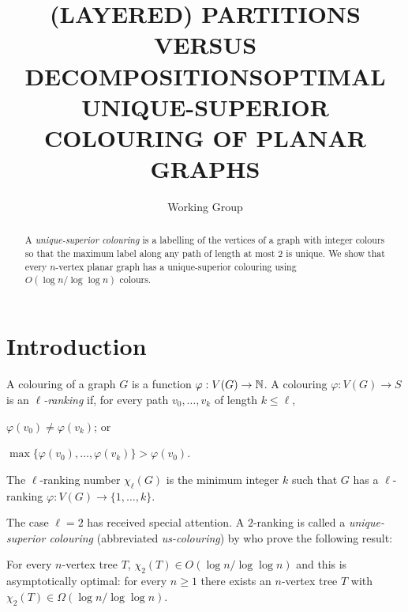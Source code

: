 \documentclass[kpfonts]{patmorin}
\title{\MakeUppercase{(Layered) Partitions versus Decompositions}}
\author{}
\title{\MakeUppercase{Optimal Unique-Superior Colouring of Planar Graphs}}
\author{Working Group}
\newcommand{\uqs}{\chi_2}
\begin{document}
\maketitle

\begin{abstract}
  A \emph{unique-superior colouring} is a labelling of the vertices of a graph with integer colours so that the maximum label along any path of length at most 2 is unique.  We show that every $n$-vertex planar graph has a unique-superior colouring using $O(\log n/\log\log n)$ colours.
\end{abstract}



\section{Introduction}


A colouring of a graph $G$ is a function $\varphi:V(G)\to \mathbb{N}$.  A colouring $\varphi:V(G)\to S$ is an \emph{$\ell$-ranking} if, for every path $v_0,\ldots,v_k$ of length $k\le\ell$,
\begin{inparaenum}[(i)]
   \item $\varphi(v_0)\neq \varphi(v_k)$; or
   \item $\max\{\varphi(v_0),\ldots,\varphi(v_k)\} > \varphi(v_0)$.
\end{inparaenum}
The $\ell$-ranking number $\chi_\ell(G)$ is the minimum integer $k$ such that $G$ has a $\ell$-ranking $\varphi:V(G)\to \{1,\ldots,k\}$.

The case $\ell=2$ has received special attention. A $2$-ranking is called a \emph{unique-superior colouring} (abbreviated \emph{us-colouring}) by \citet{karpas.neiman.ea:on} who prove the following result:

\begin{thm}\label{trees}
    For every $n$-vertex tree $T$, $\uqs(T)\in O(\log n/\log\log n)$ and this is asymptotically optimal: for every $n\ge 1$ there exists an $n$-vertex tree $T$ with $\uqs(T)\in\Omega(\log n/\log\log n)$.
\end{thm}
\end{document}
